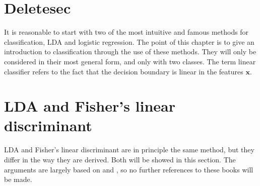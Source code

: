 \section{Deletesec}
\label{sec:Deletesec}
It is reasonable to start with two of the most intuitive and famous methods for classification, LDA and logistic regression. 
The point of this chapter is to give an introduction to classification through the use of these methods. They will only be considered in their most general form, and only with two classes. The term linear classifier refers to the fact that the decision boundary is linear in the features $\mathbf{x}$.
%
\section{LDA and Fisher's linear discriminant}
\label{sec:LDA and Fisher's linear discriminant}
LDA and Fisher's linear discriminant are in principle the same method, but they differ in the way they are derived. Both will be showed in this section. The arguments are largely based on \cite{bishop} and \cite{modstat}, so no further references to these books will be made. 

